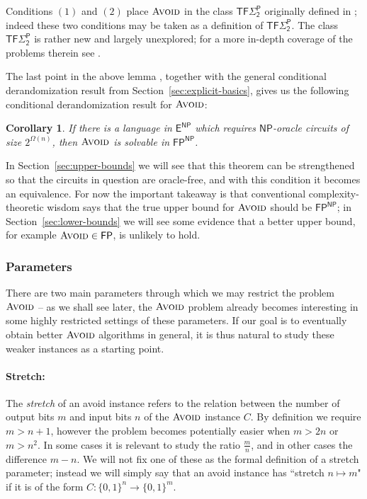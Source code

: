 \documentclass[11pt]{article}
\newtheorem{corollary}{Corollary}
\newcommand{\B}{\{0,1\}}
\newcommand{\avoid}{\textsc{Avoid}}
\begin{document}
Conditions $(1)$ and $(2)$ place $\avoid$ in the class $\mathsf{TF\Sigma_2^P}$ originally defined in \cite{total}; indeed these two conditions may be taken as a definition of $\mathsf{TF\Sigma_2^P}$. The class $\mathsf{TF\Sigma_2^P}$ is rather new and largely unexplored; for a more in-depth coverage of the problems therein see \cite{total,toni}. 

The last point in the above lemma , together with the general conditional derandomization result from Section~\ref{sec:explicit-basics}, gives us the following conditional derandomization result for $\avoid$:
\begin{corollary}\label{cor:basic-hardness-randomness-avoid}
If there is a language in $\mathsf{E^{NP}}$ which requires $\mathsf{NP}$-oracle circuits of size $2^{\Omega(n)}$, then $\avoid$ is solvable in $\mathsf{FP^{NP}}$.
\end{corollary}

In Section~\ref{sec:upper-bounds} we will see that this theorem can be strengthened so that the circuits in question are oracle-free, and with this condition it becomes an equivalence. For now the important takeaway is that conventional complexity-theoretic wisdom says that the true upper bound for $\avoid$ should be $\mathsf{FP^{NP}}$; in Section~\ref{sec:lower-bounds} we will see some evidence that a better upper bound, for example $\avoid \in \mathsf{FP}$, is unlikely to hold.

\subsubsection{Parameters}
There are two main parameters through which we may restrict the problem $\avoid$ -- as we shall see later, the $\avoid$ problem already becomes interesting in some highly restricted settings of these parameters. If our goal is to eventually obtain better $\avoid$ algorithms in general, it is thus natural to study these weaker instances as a starting point.
\paragraph{Stretch:}  The \emph{stretch} of an avoid instance refers to the relation between the number of output bits $m$ and input bits $n$ of the $\avoid$ instance $C$. By definition we require $m > n+1$, however the problem becomes potentially easier when $m > 2n$ or $m > n^2$. In some cases it is relevant to study the ratio $\frac{m}{n}$, and in other cases the difference $m - n$. We will not fix one of these as the formal definition of a stretch parameter; instead we will simply say that an avoid instance has ``stretch $n \mapsto m$" if it is of the form $C: \B^n \to \B^m$.
\end{document}
